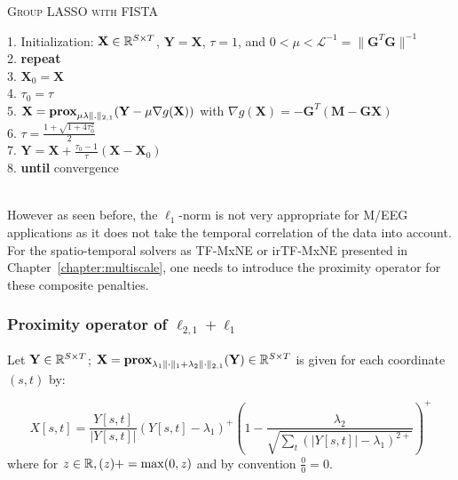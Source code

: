 {\fontsize{4}{4}\selectfont
\begin{algorithm}[t]
\caption{\textsc{Group LASSO with FISTA}}

1. Initialization: $\mathbf{X}\in\mathbb{R}^{S\times T}$, $\mathbf{Y}=\mathbf{X}$, $\tau=1$, and $0 < \mu < \mathcal{L}^{-1} = \|\mathbf{G}^T\mathbf{G}\|^{-1}$\\
2. \textbf{repeat}\\
3. \hspace{4pt} $\mathbf{X}_0 = \mathbf{X}$\\
4. \hspace{4pt} $\tau_0 = \tau$\\
5. \hspace{4pt} $\mathbf{X} = \textbf{prox}_{\mu\lambda\|.\|_{2,1}}(\mathbf{Y}-\mu\nabla g(\mathbf{X}))$ with $\nabla g(\mathbf{X})= -\mathbf{G}^T(\mathbf{M}-\mathbf{GX})$ \\
6. \hspace{4pt} $\tau = \frac{1+\sqrt{1+4\tau^2_0}}{2}$\\
7. \hspace{4pt} $\mathbf{Y} = \mathbf{X} + \frac{\tau_0 - 1}{\tau}(\mathbf{X}-\mathbf{X}_0)$\\
8. \textbf{until} convergence\\
\\
\label{alg:FISTA}
\end{algorithm}
}

However as seen before, the $\ell_1$-norm is not very appropriate for M/EEG applications as it does not take the temporal correlation of the data into account. For the spatio-temporal solvers as TF-MxNE or irTF-MxNE presented in Chapter~\ref{chapter:multiscale}, one needs to introduce the proximity operator for these composite penalties.

\adjustwidth{1em}{0pt}
\subsubsection*{Proximity operator of $\ell_{2,1}+\ell_1$}
Let $\mathbf{Y}\in\mathbb{R}^{S\times T}$; $\mathbf{X}=\textbf{prox}_{\lambda_1\|\cdot\|_1+\lambda_2\|\cdot\|_{2,1}}(\mathbf{Y})\in\mathbb{R}^{S\times T}$ is given for each coordinate $(s,t)$ by:

\begin{equation} \label{prox_mixed}
	X[s,t]=\frac{Y[s,t]}{|Y[s,t]|}(Y[s,t]-\lambda_1)^+\left(1-\frac{\lambda_2}{\sqrt{\sum_t(|Y[s,t]|-\lambda_1)^{2+}}}\right)^+
\end{equation}
where for $z\in\mathbb{R}, (z)+=\max(0,z)$ and by convention $\frac{0}{0}=0$.
\endadjustwidth


